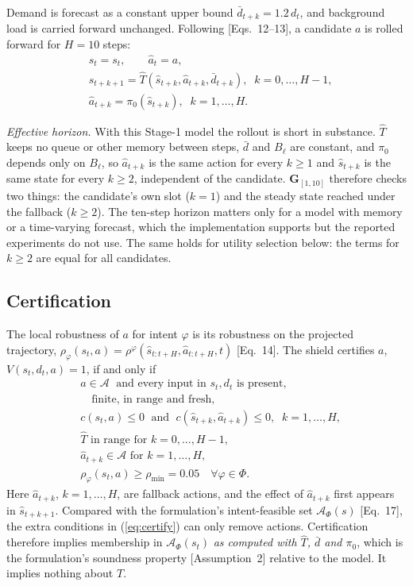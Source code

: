 \documentclass[conference]{IEEEtran}
\newcommand{\That}{\hat{T}}
\newcommand{\dbar}{\bar{d}}
\newcommand{\shat}{\hat{s}}
\newcommand{\ahat}{\hat{a}}
\newcommand{\Acal}{\mathcal{A}}
\newcommand{\rhomin}{\rho_{\min}}
\newcommand{\stlG}{\mathbf{G}}
\begin{document}
Demand is forecast as a constant upper bound $\dbar_{t+k} = 1.2\, d_t$, and
background load is carried forward unchanged. Following [Eqs.~12--13], a candidate
$a$ is rolled forward for $H = 10$ steps:
\begin{equation}
\begin{aligned}
&\shat_t = s_t,\qquad \ahat_t = a,\\
&\shat_{t+k+1} = \That(\shat_{t+k}, \ahat_{t+k}, \dbar_{t+k}),\;\; k=0,\dots,H-1,\\
&\ahat_{t+k} = \pi_0(\shat_{t+k}),\;\; k=1,\dots,H.
\end{aligned}
\label{eq:rollout}
\end{equation}

\emph{Effective horizon.} With this Stage-1 model the rollout is short in substance.
$\That$ keeps no queue or other memory between steps, $\dbar$ and $B_\ell$ are
constant, and $\pi_0$ depends only on $B_\ell$, so $\ahat_{t+k}$ is the same action for
every $k \ge 1$ and $\shat_{t+k}$ is the same state for every $k \ge 2$, independent of
the candidate. $\stlG_{[1,10]}$ therefore checks two things: the candidate's own slot
($k=1$) and the steady state reached under the fallback ($k \ge 2$). The ten-step
horizon matters only for a model with memory or a time-varying forecast, which the
implementation supports but the reported experiments do not use. The same holds
for utility selection below: the terms for $k\ge2$ are equal for all candidates.

\subsection{Certification}
The local robustness of $a$ for intent $\varphi$ is its robustness on the projected
trajectory, $\rho_\varphi(s_t,a) = \rho^{\varphi}(\shat_{t:t+H}, \ahat_{t:t+H}, t)$
[Eq.~14]. The shield certifies $a$, $V(s_t,d_t,a) = 1$, if and only if
\begin{equation}
\begin{aligned}
& a \in \Acal \;\text{ and every input in } s_t, d_t \text{ is present,}\\
& \quad\text{finite, in range and fresh},\\
& c(s_t,a) \le 0 \;\text{ and }\; c(\shat_{t+k},\ahat_{t+k}) \le 0,\;\; k=1,\dots,H,\\
& \That \text{ in range for } k=0,\dots,H-1,\\
& \ahat_{t+k} \in \Acal \text{ for } k=1,\dots,H,\\
& \rho_\varphi(s_t,a) \ge \rhomin = 0.05 \quad \forall \varphi \in \Phi .
\end{aligned}
\label{eq:certify}
\end{equation}
Here $\ahat_{t+k}$, $k=1,\dots,H$, are fallback actions, and the effect of
$\ahat_{t+k}$ first appears in $\shat_{t+k+1}$. Compared with the formulation's intent-feasible set $\Acal_\Phi(s)$ [Eq.~17], the
extra conditions in (\ref{eq:certify}) can only remove actions. Certification
therefore implies membership in $\Acal_\Phi(s_t)$ \emph{as computed with $\That$,
$\dbar$ and $\pi_0$}, which is the formulation's soundness property [Assumption~2]
relative to the model. It implies nothing about $T$.
\end{document}
